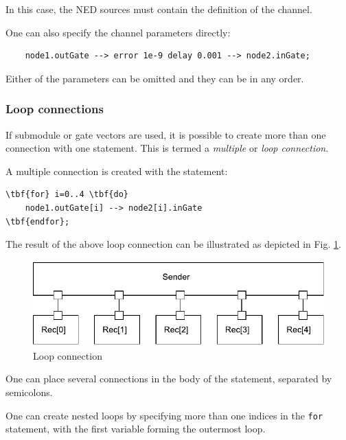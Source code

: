 In this case, the NED sources must contain the definition of
the channel.

One can also specify the channel parameters directly:
\begin{verbatim}
    node1.outGate --> error 1e-9 delay 0.001 --> node2.inGate;
\end{verbatim}

Either of the parameters can be omitted and they can be in any
order.


\subsubsection{Loop connections}


If submodule or gate vectors are used, it is possible to create
more than one connection with one statement. This is termed a \textit{multiple}
or \textit{loop connection}.

A multiple connection is created with the 
statement:

\begin{Verbatim}[commandchars=\\\{\}]
\tbf{for} i=0..4 \tbf{do}
    node1.outGate[i] --> node2[i].inGate
\tbf{endfor};
\end{Verbatim}


The result of the above loop connection can be illustrated as
depicted in Fig. \ref{fig:ch-ned-lang:loop-connection}.

\begin{figure}[htbp]
\begin{center}
\includegraphics[width=4.625in, height=1.297in]{figures/usmanFig7}
\caption{Loop connection}
\label{fig:ch-ned-lang:loop-connection}
\end{center}
\end{figure}


One can place several connections in the body of the
 statement, separated by semicolons.

One can create nested loops
by specifying more than one indices in the \texttt{for} statement,
with the first variable forming the outermost loop.

